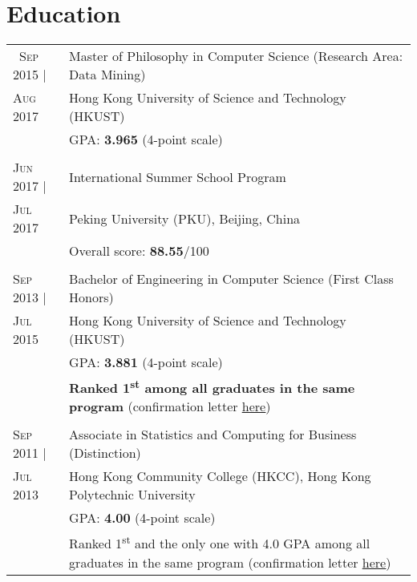 \documentclass[10pt, oneside]{article}
\def \b {\textbf}
\begin{document}
\section*{Education}
\begin{tabularx}{\linewidth}{p{2.2cm}|p{17cm}}
	\toprule 
\textsc{~Sep} 2015 |  & Master of Philosophy in Computer Science (Research Area: Data Mining)\\
\textsc{Aug} 2017 & Hong Kong University of Science and Technology (HKUST)\\
& GPA: \b{3.965} (4-point scale)
\\\\
\textsc{Jun} 2017 |  & International Summer School Program \\
\textsc{Jul} 2017& Peking University (PKU), Beijing, China
	\\& Overall score: \textbf{88.55}/100
\\\\
\textsc{Sep} 2013 |  & Bachelor of Engineering in Computer Science (First Class Honors)\\
\textsc{Jul} 2015& Hong Kong University of Science and Technology (HKUST)\\
& GPA: \b{3.881} (4-point scale) %
\\
&\b{Ranked {1\textsuperscript{st}} among all graduates in the same program} (confirmation letter \href{https://drive.google.com/open?id=1ZCn4DEuqxciS6mTMCwEY44IbwPbFbu3G}{\underline{here}})
\\\\
\textsc{Sep} 2011 |  & Associate in Statistics and Computing for Business (Distinction)\\
\textsc{Jul} 2013& Hong Kong Community College (HKCC), Hong Kong Polytechnic University\\
& GPA: \b{4.00} (4-point scale)\\
&Ranked 1\textsuperscript{st} and the only one with 4.0 GPA among all graduates in the same program (confirmation letter \href{https://drive.google.com/file/d/1cgY5f74OeQwvsQzqbZbWYSRvBQIEI66W/view?usp=sharing}{\underline{here}})
\end{tabularx}
\vspace*{-0.5cm}
\end{document}
